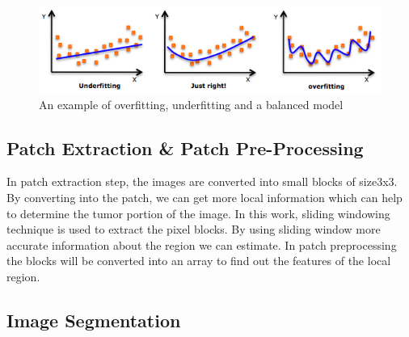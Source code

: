       \begin{figure}[h!]
        \centering
         \includegraphics[scale=0.5]{Figures/over_under.png}
        \caption{An example of overfitting, underfitting and a balanced model}
      \end{figure}
      
      \subsection{Patch Extraction & Patch Pre-Processing}
      
    In patch extraction step, the images are converted into small blocks of size3x3. By converting into the patch, we can get more local information which can help to determine the tumor portion of the image. In this work, sliding windowing technique is used to extract the pixel blocks. By using sliding window more accurate information about the region we can estimate. In patch preprocessing the blocks will be converted into an array to find out the features of the local region.      
  
  
  
    


\subsection{Image Segmentation}

